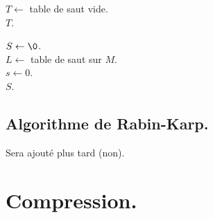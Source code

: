 \documentclass[french, 11pt]{article}
\begin{document}
\begin{defi}{}{}
    \begin{algorithm}[H]
        \caption{Construction de la table de saut}
        $T \gets $ table de saut vide.\\
        \Retour $T$.
    \end{algorithm}

    \begin{algorithm}[H]
        \caption{Algorithme de Boyer-Moore-Horspool}
        $S \gets \0$.\\
        $L \gets $ table de saut sur $M$.\\
        $s \gets 0$.\\
        \Retour $S$.
    \end{algorithm}
\end{defi}

\subsection{Algorithme de Rabin-Karp.}

\begin{center}
    Sera ajouté plus tard (non).
\end{center}

\pagebreak

\section{Compression.}
\end{document}
